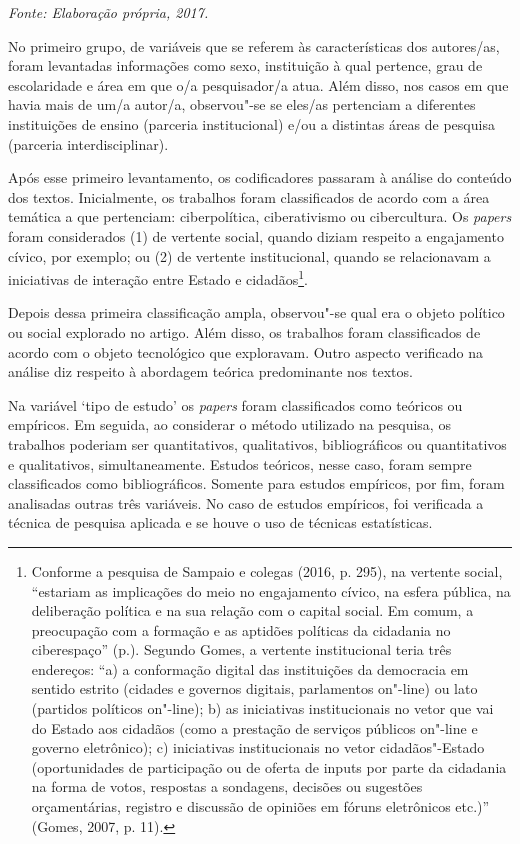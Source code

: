 \begin{center}
{\footnotesize\emph{Fonte: Elaboração própria, 2017.}}
\end{center}

No primeiro grupo, de variáveis que se referem às características dos
autores/as, foram levantadas informações como sexo, instituição à qual
pertence, grau de escolaridade e área em que o/a pesquisador/a atua.
Além disso, nos casos em que havia mais de um/a autor/a, observou"-se se
eles/as pertenciam a diferentes instituições de ensino (parceria
institucional) e/ou a distintas áreas de pesquisa (parceria
interdisciplinar).

Após esse primeiro levantamento, os codificadores passaram à análise do
conteúdo dos textos. Inicialmente, os trabalhos foram classificados de
acordo com a área temática a que pertenciam: ciberpolítica,
ciberativismo ou cibercultura. Os \emph{papers} foram considerados (1)
de vertente social, quando diziam respeito a engajamento cívico, por
exemplo; ou (2) de vertente institucional, quando se relacionavam a
iniciativas de interação entre Estado e cidadãos\footnote{Conforme a
  pesquisa de Sampaio e colegas (2016, p. 295), na vertente social,
  ``estariam as implicações do meio no engajamento cívico, na esfera
  pública, na deliberação política e na sua relação com o capital
  social. Em comum, a preocupação com a formação e as aptidões políticas
  da cidadania no ciberespaço'' (p.). Segundo Gomes, a vertente
  institucional teria três endereços: ``a) a conformação digital das
  instituições da democracia em sentido estrito (cidades e governos
  digitais, parlamentos on"-line) ou lato (partidos políticos on"-line);
  b) as iniciativas institucionais no vetor que vai do Estado aos
  cidadãos (como a prestação de serviços públicos on"-line e governo
  eletrônico); c) iniciativas institucionais no vetor cidadãos"-Estado
  (oportunidades de participação ou de oferta de inputs por parte da
  cidadania na forma de votos, respostas a sondagens, decisões ou
  sugestões orçamentárias, registro e discussão de opiniões em fóruns
  eletrônicos etc.)'' (Gomes, 2007, p. 11).}.

Depois dessa primeira classificação ampla, observou"-se qual era o objeto
político ou social explorado no artigo. Além disso, os trabalhos foram
classificados de acordo com o objeto tecnológico que exploravam. Outro
aspecto verificado na análise diz respeito à abordagem teórica
predominante nos textos.

Na variável `tipo de estudo' os \emph{papers} foram classificados como
teóricos ou empíricos. Em seguida, ao considerar o método utilizado na
pesquisa, os trabalhos poderiam ser quantitativos, qualitativos,
bibliográficos ou quantitativos e qualitativos, simultaneamente. Estudos
teóricos, nesse caso, foram sempre classificados como bibliográficos.
Somente para estudos empíricos, por fim, foram analisadas outras três
variáveis. No caso de estudos empíricos, foi verificada a técnica de
pesquisa aplicada e se houve o uso de técnicas estatísticas.

